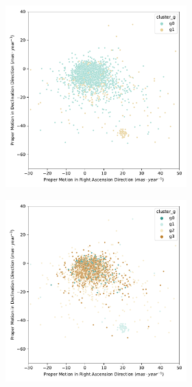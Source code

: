 \documentclass[11pt, a4paper, english]{book}
\begin{document}
\begin{figure}[htbp]
  \centering
  \begin{subfigure}{0.9\textwidth}
    \centering
    \begin{subfigure}[t]{0.3\textwidth}
      \centering
      \includegraphics[width=\textwidth]{../figures/kmeans_n2_pm_melotte_22.pdf}
    \end{subfigure}
    \hfill
    \begin{subfigure}[t]{0.3\textwidth}
      \centering
      \includegraphics[width=\textwidth]{../figures/kmeans_n5_pm_melotte_22.pdf}

\end{subfigure}
\end{subfigure}
\end{figure}
\end{document}
